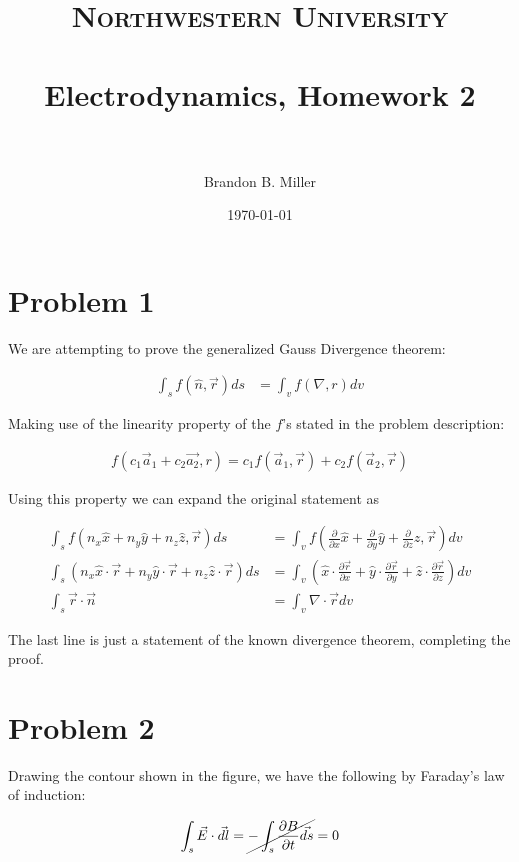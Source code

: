 \documentclass[paper=a4, fontsize=11pt]{scrartcl} %
\title{	
\normalfont \normalsize 
\textsc{Northwestern University} \\ [25pt] %
\horrule{0.5pt} \\[0.4cm] %
\huge Electrodynamics, Homework 2 \\ %
\horrule{2pt} \\[0.5cm] %
}
\author{Brandon B. Miller} %
\date{\normalsize\today} %
\numberwithin{equation}{section} %
\numberwithin{figure}{section} %
\numberwithin{table}{section} %
\begin{document}
\maketitle %

\section{Problem 1}

We are attempting to prove the generalized Gauss Divergence theorem:

\begin{align}
\int_s f(\hat{n}, \vec{r}) ds &= \int_v f(\nabla, r) dv 
\end{align}

Making use of the linearity property of the $f$'s stated in the problem description:

\begin{align}
f(c_1 \vec{a}_1 + c_2 \vec{a_2}, r) = c_1f(\vec{a}_1, \vec{r}) + c_2f(\vec{a}_2, \vec{r})
\end{align}

Using this property we can expand the original statement as 

\begin{align}
\int_s f(n_x\hat{x} + n_y\hat{y} + n_z\hat{z}, \vec{r})ds &= \int_v f(\frac{\partial}{\partial x}\hat{x} + \frac{\partial}{\partial y}\hat{y} + \frac{\partial}{\partial z}\hat{z}, \vec{r}) dv\\
\int_s (n_x\hat{x}\cdot\vec{r} + n_y\hat{y}\cdot\vec{r} + n_z\hat{z}\cdot\vec{r}) ds &= \int_v (\hat{x}\cdot\frac{\partial \vec{r}}{\partial x} + \hat{y}\cdot\frac{\partial \vec{r}}{\partial y} + \hat{z}\cdot\frac{\partial \vec{r}}{\partial z})dv \\
\int_s \vec{r} \cdot \vec{n} &= \int_v \nabla \cdot \vec{r} dv
\end{align}

The last line is just a statement of the known divergence theorem, completing the proof. 


\section{Problem 2}

Drawing the contour shown in the figure, we have the following by Faraday's law of induction:

\begin{align}
\int_s \vec{E}\cdot \vec{dl} &= \cancel{-\int_s \frac{\partial B}{\partial t}\vec{ds}} = 0 \\
\end{align}
\end{document}
